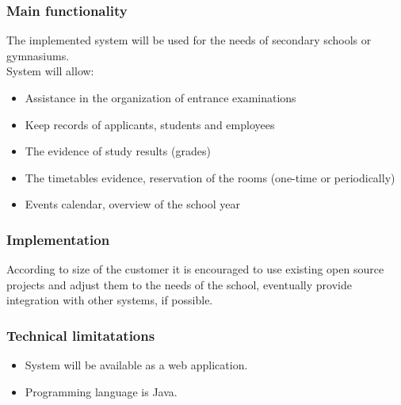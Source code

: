\documentclass[12pt]{article}
\begin{document}
\subsubsection{Main functionality}
The implemented system will be used for the needs of secondary schools or gymnasiums. 
\\
System will allow:
\begin{itemize}
\item{Assistance in the organization of entrance examinations}
\item{Keep records of applicants, students and employees}
\item{The evidence of study results (grades)}
\item{The timetables evidence, reservation of the rooms (one-time or periodically)}
\item{Events calendar, overview of the school year}
\end{itemize}

\subsubsection{Implementation}
According to size of the customer it is encouraged to use existing open source projects and adjust them to the needs of the school, eventually provide integration with other systems, if possible.
\subsubsection{Technical limitatations}
\begin{itemize}
\item{System will be available as a web application. }
\item{Programming language is Java.}
\end{itemize}
\end{document}
